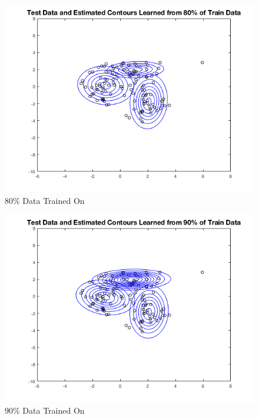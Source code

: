 \documentclass[english]{article}
\begin{document}
\begin{enumerate}
\begin{enumerate}
	\begin{figure}[H]
        \centering
    	\includegraphics[scale = 0.5]{3_1_b_80}
    	\caption{80\% Data Trained On}
    	\label{fig:3_1_b_80}
    	\end{figure}
	
	\begin{figure}[H]
        \centering
    	\includegraphics[scale = 0.5]{3_1_b_90}
    	\caption{90\% Data Trained On}
    	\label{fig:3_1_b_90}
    	\end{figure}
	

\end{enumerate}
\end{enumerate}
\end{document}
